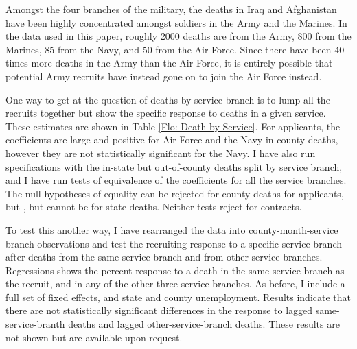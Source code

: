 \documentclass[12pt] {article}
\begin{document}
\begin{table}
\caption{}
\label{Flo:Recruits by Service}
\scalebox{0.8}{
}
\end{table}

Amongst the four branches of the military, the deaths in Iraq and Afghanistan have been highly concentrated amongst soldiers in the Army and the Marines. In the data used in this paper, roughly 2000 deaths are from the Army, 800 from the Marines, 85 from the Navy, and 50 from the Air Force. Since there have been 40 times more deaths in the Army than the Air Force, it is entirely possible that potential Army recruits have instead gone on to join the Air Force instead.

One way to get at the question of deaths by service branch is to lump all the recruits together but show the specific  response to deaths in a given service. These estimates are shown in Table \ref{Flo: Death by Service}. For applicants, the coefficients are large and positive for Air Force and the Navy in-county deaths, however they are not statistically significant for the Navy. I have also run specifications with the in-state but out-of-county deaths split by service branch, and I have run tests of equivalence of the coefficients for all the service branches. The null hypotheses of equality can be rejected for county deaths for applicants, but , but cannot be for state deaths. Neither tests reject for contracts.

\begin{table}
\caption{}
\label{Flo: Death by Service}
\scalebox{0.8}{
}
\end{table}

To test this another way, I have rearranged the data into county-month-service branch observations and test the recruiting response to a specific service branch after deaths from the same service branch and from other service branches. Regressions shows the percent response to a death in the same service branch as the recruit, and in any of the other three service branches. As before, I include a full set of fixed effects, and state and county unemployment. Results indicate that there are not statistically significant differences in the response to lagged same-service-branth deaths and lagged other-service-branch deaths. These results are not shown but are available upon request.
\end{document}
